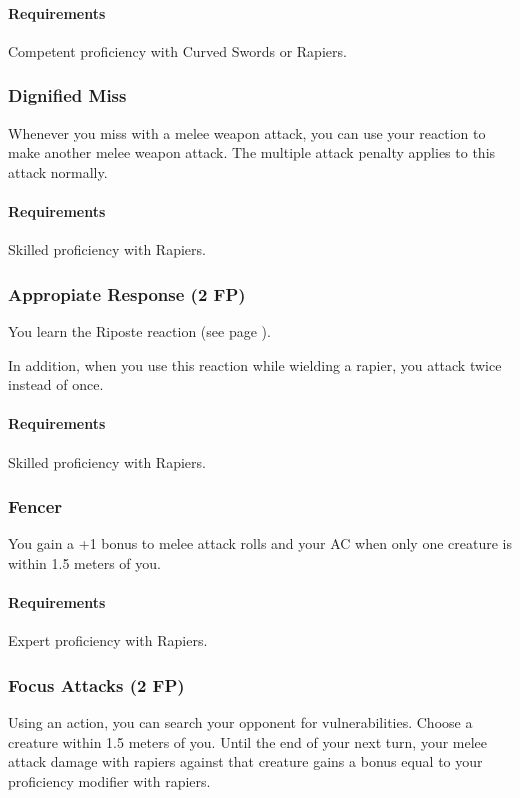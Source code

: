     \paragraph{Requirements} Competent proficiency with Curved Swords or Rapiers.
\subsubsection{Dignified Miss} \label{feat::dignifiedmiss}
    Whenever you miss with a melee weapon attack, you can use your reaction to make another melee weapon attack.
    The multiple attack penalty applies to this attack normally.
    \paragraph{Requirements} Skilled proficiency with Rapiers.
\subsubsection{Appropiate Response (2 FP)} \label{feat::appropiateresponse}
    You learn the Riposte reaction (see page \pageref{act::riposte}).

    In addition, when you use this reaction while wielding a rapier, you attack twice instead of once.
    \paragraph{Requirements} Skilled proficiency with Rapiers.
\subsubsection{Fencer} \label{feat::fencer}
    You gain a +1 bonus to melee attack rolls and your AC when only one creature is within 1.5 meters of you.
    \paragraph{Requirements} Expert proficiency with Rapiers.
\subsubsection{Focus Attacks (2 FP)} \label{feat::focusattacks}
    Using an action, you can search your opponent for vulnerabilities.
    Choose a creature within 1.5 meters of you.
    Until the end of your next turn, your melee attack damage with rapiers against that creature gains a bonus equal to your proficiency modifier with rapiers.
